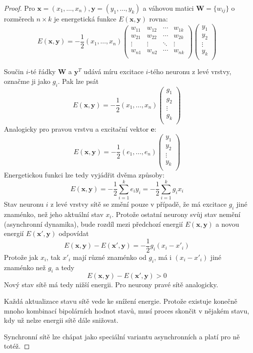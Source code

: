 \documentclass[11pt]{report} %
\renewcommand{\vec}[1]{\mathbf{#1}}
\numberwithin{equation}{section}
\begin{document}
\begin{proof}
Pro $\vec{x} = (x_1, \dots, x_n), \vec{y} = (y_1, \dots, y_k)$ a váhovou matici $\vec{W} = \{w_{ij}\}$ o rozměrech $n\times k$ je energetická funkce $E(\vec{x},\vec{y})$ rovna:
$$
E(\vec{x},\vec{y}) = -\frac{1}{2}(x_1,\dots,x_n)
\begin{pmatrix}
w_{11} & w_{12} & \cdots & w_{1k} \\
w_{21} & w_{22} & \cdots & w_{2k} \\
\vdots  & \vdots  & \ddots & \vdots\\
w_{n1} & w_{n2} & \cdots & w_{nk} \\
\end{pmatrix}
\begin{pmatrix}
y_1\\
y_2 \\
\vdots\\
y_k\\
\end{pmatrix}
$$

Součin $i$-té řádky $\vec{W}$ a $\vec{y}^T$ udává míru excitace $i$-tého neuronu z levé vrstvy, označme ji jako $g_i$. Pak lze psát
$$
E(\vec{x},\vec{y}) = -\frac{1}{2}(x_1,\dots,x_n)
\begin{pmatrix}
g_1\\
g_2 \\
\vdots\\
g_k\\
\end{pmatrix}
$$
Analogicky pro pravou vrstvu a excitační vektor $\vec{e}$:
$$
E(\vec{x},\vec{y}) = -\frac{1}{2}(e_1,\dots,e_n)
\begin{pmatrix}
y_1\\
y_2 \\
\vdots\\
y_k\\
\end{pmatrix}
$$
Energetickou funkci lze tedy vyjádřit dvěma způsoby:
$$
E(\vec{x},\vec{y}) = -\frac{1}{2}\sum\limits_{i=1}^{k} e_i y_i = -\frac{1}{2}\sum\limits_{i=1}^{k} g_i x_i
$$
Stav neuronu $i$ z levé vrstvy sítě se změní pouze v případě, že má excitace $g_i$ jiné znaménko, než jeho
aktuální stav $x_i$. Protože ostatní neurony svůj stav nemění (asynchronní dynamika), bude rozdíl mezi předchozí energií $E(\vec{x},\vec{y})$ a novou energií $E(\vec{x'},\vec{y})$ odpovídat
$$E(\vec{x},\vec{y}) - E(\vec{x'},\vec{y}) = -\frac{1}{2}g_i(x_i - x'_i)$$
Protože jak $x_i$, tak $x'_i$ mají různé znaménko od $g_i$, má i $(x_i - x'_i)$ jiné znaménko než $g_i$ a tedy 
$$E(\vec{x},\vec{y}) - E(\vec{x'},\vec{y}) > 0$$
Nový stav sítě má tedy nižší energii. Pro neurony pravé sítě analogicky.

Každá aktualizace stavu sítě vede ke snížení energie. Protože existuje konečně mnoho kombinací bipolárních
hodnot stavů, musí proces skončit v nějakém stavu, kdy už nelze energii sítě dále snižovat.

Synchronní sítě lze chápat jako speciální variantu asynchronních a platí pro ně totéž.
\end{proof}
\end{document}
